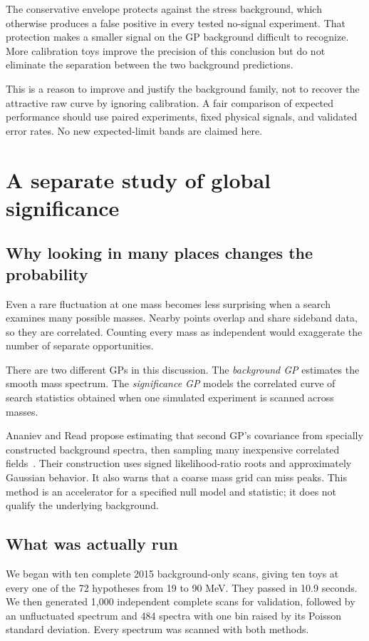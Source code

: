 \documentclass[11pt]{article}
\begin{document}
The conservative envelope protects against the stress background, which otherwise produces a false positive in every tested no-signal experiment. That protection makes a smaller signal on the GP background difficult to recognize. More calibration toys improve the precision of this conclusion but do not eliminate the separation between the two background predictions.

This is a reason to improve and justify the background family, not to recover the attractive raw curve by ignoring calibration. A fair comparison of expected performance should use paired experiments, fixed physical signals, and validated error rates. No new expected-limit bands are claimed here.

\clearpage
\section{A separate study of global significance}
\subsection{Why looking in many places changes the probability}
Even a rare fluctuation at one mass becomes less surprising when a search examines many possible masses. Nearby points overlap and share sideband data, so they are correlated. Counting every mass as independent would exaggerate the number of separate opportunities.

There are two different GPs in this discussion. The \emph{background GP} estimates the smooth mass spectrum. The \emph{significance GP} models the correlated curve of search statistics obtained when one simulated experiment is scanned across masses.

Ananiev and Read propose estimating that second GP's covariance from specially constructed background spectra, then sampling many inexpensive correlated fields~\cite{ananiev}. Their construction uses signed likelihood-ratio roots and approximately Gaussian behavior. It also warns that a coarse mass grid can miss peaks. This method is an accelerator for a specified null model and statistic; it does not qualify the underlying background.

\subsection{What was actually run}
We began with ten complete 2015 background-only scans, giving ten toys at every one of the 72 hypotheses from 19 to 90 MeV. They passed in 10.9 seconds. We then generated 1,000 independent complete scans for validation, followed by an unfluctuated spectrum and 484 spectra with one bin raised by its Poisson standard deviation. Every spectrum was scanned with both methods.
\end{document}
